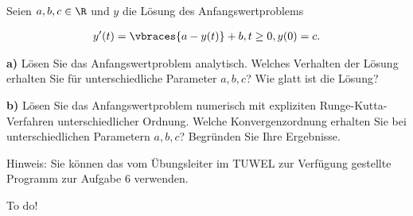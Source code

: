 \begin{exercise}
  Seien $a,b,c \in \R$  und $y$ die Lösung des Anfangswertproblems

  \begin{align}
    y'(t)=\vbraces{a-y(t)} + b, \text{} t\geq 0,\text{} y(0) = c.
  \end{align}

  \textbf{a) }Lösen Sie das Anfangswertproblem analytisch. Welches Verhalten der Lösung
  erhalten Sie für unterschiedliche Parameter $a,b,c$? Wie glatt ist die Lösung?

  \textbf{b) }Lösen Sie das Anfangswertproblem numerisch mit expliziten Runge-Kutta-Verfahren
  unterschiedlicher Ordnung. Welche Konvergenzordnung erhalten Sie bei unterschiedlichen
  Parametern $a,b,c$? Begründen Sie Ihre Ergebnisse.

  Hinweis: Sie können das vom Übungsleiter im TUWEL zur Verfügung gestellte Programm zur
  Aufgabe 6 verwenden.
\end{exercise}

\begin{solution}
  To do!
\end{solution}
